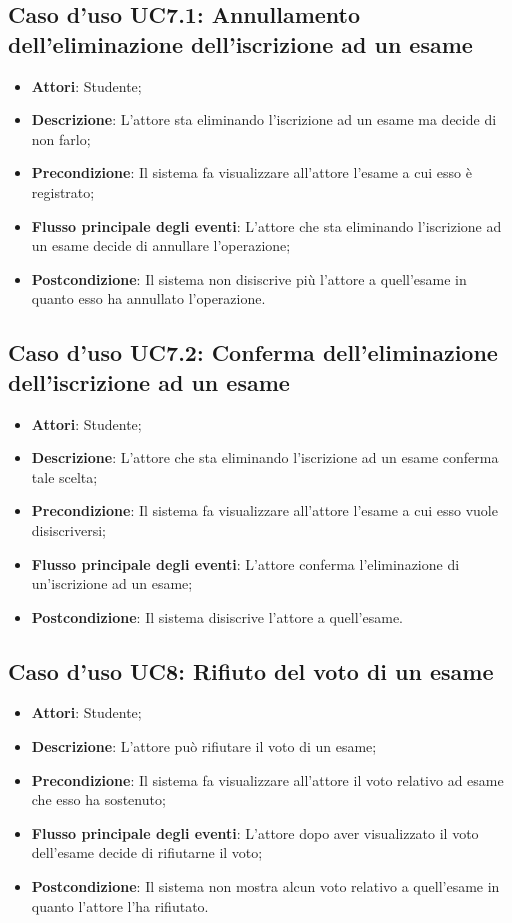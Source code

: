 \subsection{Caso d'uso \texorpdfstring{UC7.1}{UC7.1}: Annullamento dell'eliminazione dell'iscrizione ad un esame}
\begin{itemize}
	\item \textbf{Attori}: Studente;
	\item \textbf{Descrizione}: L'attore sta eliminando l'iscrizione ad un esame ma decide di non farlo;
	\item \textbf{Precondizione}: Il sistema fa visualizzare all'attore l'esame a cui esso è registrato;
	
	\item \textbf{Flusso principale degli eventi}: L'attore che sta eliminando l'iscrizione ad un esame decide di annullare l'operazione;
	\item \textbf{Postcondizione}: Il sistema non disiscrive più l'attore a quell'esame in quanto esso ha annullato l'operazione.
	
\end{itemize}
\subsection{Caso d'uso \texorpdfstring{UC7.2}{UC7.2}: Conferma dell'eliminazione dell'iscrizione ad un esame}
\begin{itemize}
	\item \textbf{Attori}: Studente;
	\item \textbf{Descrizione}: L'attore che sta eliminando l'iscrizione ad un esame conferma tale scelta;
	\item \textbf{Precondizione}: Il sistema fa visualizzare all'attore l'esame a cui esso vuole disiscriversi;
	
	\item \textbf{Flusso principale degli eventi}: L'attore conferma l'eliminazione di un'iscrizione ad un esame;
	\item \textbf{Postcondizione}: Il sistema disiscrive l'attore a quell'esame.
	
\end{itemize}
\subsection{Caso d'uso \texorpdfstring{UC8}{UC8}: Rifiuto del voto di un esame}
\begin{itemize}
	\item \textbf{Attori}: Studente;
	\item \textbf{Descrizione}: L'attore può rifiutare il voto di un esame;
	\item \textbf{Precondizione}: Il sistema fa visualizzare all'attore il voto relativo ad esame che esso ha sostenuto;
	\item \textbf{Flusso principale degli eventi}: L'attore dopo aver visualizzato il voto dell'esame decide di rifiutarne il voto;
	\item \textbf{Postcondizione}: Il sistema non mostra alcun voto relativo a quell'esame in quanto l'attore l'ha rifiutato.
\end{itemize}
